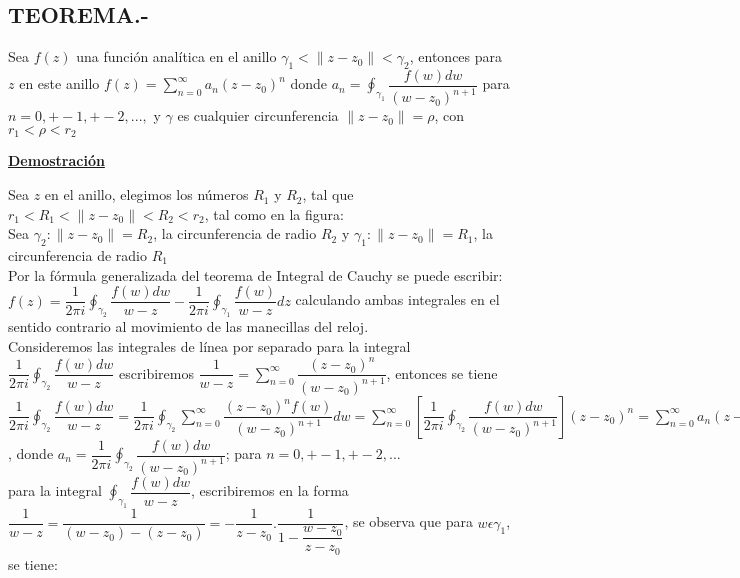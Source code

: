\documentclass[10pt,a4paper]{article}
\begin{document}
\subsection{TEOREMA.-}
Sea $f(z)$ una función analítica en el anillo $\displaystyle{\gamma_1 < \parallel z - z_0 \parallel < \gamma_2}$, entonces para $z$ en este anillo $\displaystyle{f(z) = \sum_{n = 0}^{\infty} a_n (z-z_0)^n}$ donde $\displaystyle{a_n = \oint_{\gamma_1} \dfrac{f(w) dw}{(w-z_0)^{n+1}}}$ para $\displaystyle{n = 0, +- 1, +-2,...,}$ y $\gamma$ es cualquier circunferencia $\parallel  z - z_0 \parallel = \rho$, con $r_1 < \rho < r_2$\\
 \begin{center}
  \textbf{\underline{Demostración}}
  \end{center} 
Sea $z$ en el anillo, elegimos los números $R_1$ y $R_2$, tal que $\displaystyle{r_1 < R_1 <  \parallel z -z_0  \parallel < R_2 < r_2}$, tal como en la figura: \\
Sea $\gamma_2 : \parallel z - z_0 \parallel = R_2$, la circunferencia de radio $R_2$ y $\gamma_1 : \parallel z -z_0 \parallel = R_1$, la circunferencia de radio $R_1$\\
Por la fórmula generalizada del teorema de Integral de Cauchy se puede escribir: \\
$\displaystyle{f(z) = \dfrac{1}{2 \pi i} \oint_{\gamma_2} \dfrac{f(w)dw}{w-z} - \dfrac{1}{2 \pi i} \oint_{\gamma_1} \dfrac{f(w)}{w-z}dz }$		
calculando ambas integrales en el sentido contrario al movimiento de las manecillas del reloj. \\
Consideremos las integrales de línea por separado para la integral $\displaystyle{\dfrac{1}{2 \pi i} \oint_{\gamma_2} \dfrac{f(w)dw}{w-z}}$ escribiremos $\displaystyle{\dfrac{1}{w-z} = \sum_{n=0}^{\infty} \dfrac{(z-z_0)^n}{(w-z_0)^{n+1}}}$, entonces se tiene\\
$\displaystyle{\dfrac{1}{2 \pi i} \oint_{\gamma_2} \dfrac{f(w)dw}{w-z} = \dfrac{1}{2 \pi i} \oint_{\gamma_2} \sum_{n=0}^{\infty}  \dfrac{(z-z_0)^n f(w)}{(w-z_0)^{n+1}} dw =  \sum_{n=0}^{\infty} [ \dfrac{1}{2 \pi i} \oint_{\gamma_2} \dfrac{f(w) dw}{(w-z_0)^{n+1}}] (z-z_0)^n=\sum_{n = 0}^{\infty} a_n (z-z_0)^n}$ , donde $\displaystyle{a_n = \dfrac{1}{2 \pi i} \oint_{\gamma_2} \dfrac{f(w) dw}{(w-z_0)^{n+1}}}$; para $\displaystyle{n = 0,+-1,+-2,...}$ \\
para la integral $\displaystyle{\oint_{\gamma_1} \dfrac{f(w) dw}{w-z}}$, escribiremos en la forma \\
$\displaystyle{\dfrac{1}{w-z} = \dfrac{1}{(w-z_0)-(z-z_0)} = - \dfrac{1}{z-z_0}.\dfrac{1}{1-\dfrac{w-z_0}{z-z_0}}}$, se observa que para $w \epsilon \gamma_1$, se tiene: \\
\end{document}
